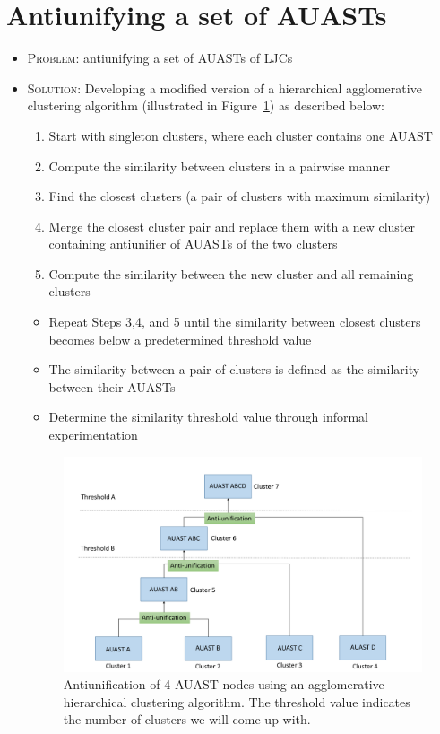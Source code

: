 \section{Antiunifying a set of AUASTs} \label{meth-clustering}
\begin{itemize} [leftmargin=.1in]
\item \textsc{Problem: } antiunifying a set of AUASTs of LJCs
\item \textsc{Solution: }Developing a modified version of a hierarchical agglomerative clustering algorithm (illustrated in Figure~\ref{fig:overview2}) as described below:
\begin{enumerate} [leftmargin=.3in]
\item Start with singleton clusters, where each cluster contains one AUAST
\item Compute the similarity between clusters in a pairwise manner
\item Find the closest clusters (a pair of clusters with maximum  similarity)
\item Merge the closest cluster pair and replace them with a new cluster containing antiunifier of AUASTs of the two clusters
\item Compute the similarity between the new cluster and all remaining clusters
\end{enumerate}
\begin{itemize} [leftmargin=.3in]
\item Repeat Steps 3,4, and 5 until the similarity between closest clusters becomes below a predetermined threshold value
\item The similarity between a pair of clusters is defined as the similarity between their AUASTs
\item Determine the similarity threshold value through informal experimentation
\end{itemize}
\begin{figure} [H]
  \centering\includegraphics [width = \textwidth]{Drawing4/overview2.pdf}
  \caption{Antiunification of 4 AUAST nodes using an agglomerative hierarchical clustering algorithm. The threshold value indicates the number of clusters we will come up with.}
  \label{fig:overview2}
\end{figure}
\end{itemize}

